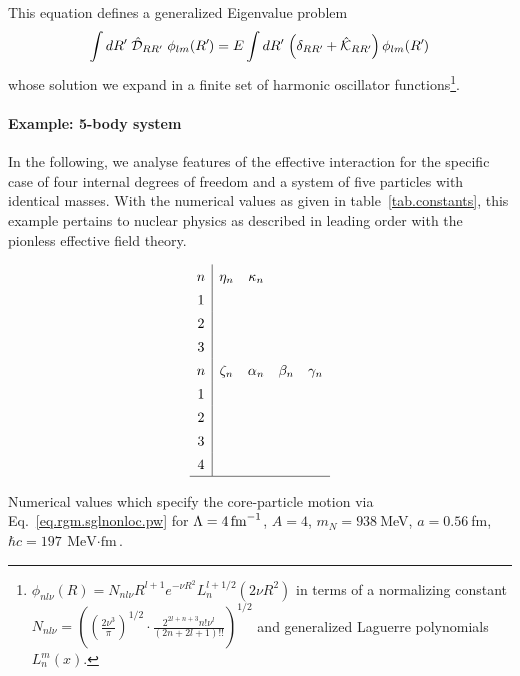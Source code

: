 \documentclass
[aps,nofootinbib,prl,showpacs,twocolumn,groupedaddress,superscriptaddress]
{revtex4}
\newcommand*{\mprime}{^{\prime}\mkern-1.2mu}
\newcommand{\la}{\label}
\newcommand{\be}{\begin{equation}}
\newcommand{\ee}{\end{equation}}
\newcommand{\lam}[1]{\mbox{\ensuremath{\Lambda=#1\,\text{fm}^{-1}}}}
\begin{document}
This equation defines a generalized Eigenvalue problem
\be\la{eq.rgm.gev}
\int dR\mprime~\hat{\mathcal{D}}_{RR\mprime}~\phi_{lm}(R\mprime)=
E\int dR\mprime\,\left(\delta_{RR\mprime}+\hat{\mathcal{K}}_{RR\mprime}\right)
\phi_{lm}(R\mprime)
\ee
whose solution we expand in a finite set of harmonic oscillator
functions\footnote{
$\phi_{nl\nu}(R)=N_{nl\nu}R^{l+1}e^{-\nu R^2}L_{n}^{l+1/2}(2\nu R^2)$
in terms of a normalizing constant $N_{nl\nu}=
\left(\left(\frac{2\nu^3}{\pi}\right)^{1/2}\cdot\frac{2^{2l+n+3}n!\nu^l}{(2n+2l+1)!!}\right)^{1/2}$ and generalized
Laguerre polynomials $L_n^m(x)$.
}.

\paragraph{Example: 5-body system}
In the following, we analyse features of the effective interaction for the
specific case of four internal degrees of freedom and a system of five particles
with identical masses. With the numerical values as given in table~\ref{tab.constants},
this example pertains to nuclear physics as described in leading order with the
pionless effective field theory.

\begin{table}
\be\la{tab.constants}
\setlength{\tabcolsep}{4pt}
\renewcommand{\arraystretch}{1.4}
\begin{array}{c|cccc}
n & \eta_n & \kappa_n & & \\
1 & & & & \\
2 & & & & \\
3 & & & & \\
n & \zeta_n & \alpha_n & \beta_n & \gamma_n \\
1 & & & & \\
2 & & & & \\
3 & & & & \\
4 & & & & \\
\hline
\end{array}
\ee
\caption{Numerical values which specify the core-particle motion via
Eq.~\eqref{eq.rgm.sglnonloc.pw} for $\lam{4}$, $A=4$, $m_N=938~$MeV, $a=0.56~$fm, $\hbar c=197~\text{MeV$\cdot$fm}$.}
\end{table}

\newpage
\end{document}
